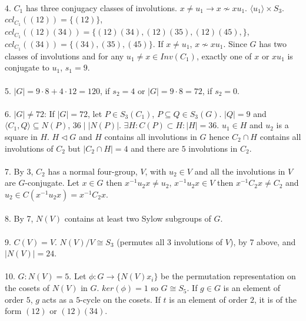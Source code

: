 \\
4.
$C_1$ has three conjugacy classes of involutions.  $x \ne u_1 \rightarrow x \nsim x u_1$.
$ \langle u_1 \rangle \times S_3$. 
$ccl_{C_1}((12))= \{ (12) \}$,
$ccl_{C_1}((12)(34))= \{ (12)(34), (12)(35), (12)(45), \}$,
$ccl_{C_1}((34))= \{ (34) , (35), (45) \}$.  If $x \ne u_1$, $ x \nsim x u_1$.
Since $G$ has two classes of involutions and for any $u_1 \ne x \in Inv(C_1 )$,
exactly one of $x$  or $xu_1$ is conjugate to $u_1$, $s_1 = 9$.
\\
\\
5.
$|G|= 9 \cdot 8 + 4 \cdot 12 = 120$, if $s_2=4$ or $|G|= 9 \cdot 8 = 72$, if $s_2 = 0$.
\\
\\
6. $|G| \ne 72$: If $|G|=72$, let
$P \in S_3(C_1)$, $P \subseteq Q \in S_3(G)$.  
$|Q|=9$ and $ \langle C_1 , Q \rangle \subseteq N(P)$,
$36 \mid |N(P)|$.
$\exists H: C(P) \subset H: |H|=36$.  $u_1 \in H$ and $u_2$ is a square in $H$.
$H \lhd G$ and $H$ contains all involutions in $G$ hence $C_2 \cap H$ contains all involutions of
$C_2$ but $|C_2 \cap H|=4$ and there are $5$ involutions in $C_2$.
\\
\\
7. By 3, $C_2$ has a normal four-group, $V$, with $u_2 \in V$ and all the involutions
in $V$ are $G$-conjugate.
Let $x \in G$ then $x^{-1} u_2 x \ne u_2$, $x^{-1} u_2 x \in V$ then
$x^{-1} C_2 x \ne C_2$ and
$u_2 \in C(x^{-1} u_2 x) = x^{-1} C_2 x$.
\\
\\
8. By 7, $N(V)$ contains at least two Sylow subgroups of $G$.
\\
\\
9.  $C(V)=V$.
$N(V)/V \cong S_3$ (permutes all $3$ involutions of $V$), by 7 above, and $|N(V)|= 24$.
\\
\\
10. $G:N(V)= 5$. Let $\phi: G \rightarrow \{N(V)x_i\}$ be the permutation representation
on the cosets of $N(V)$ in $G$.  $ker(\phi) = 1$ so $G \cong S_5$.
If $g \in G$ is an element
of order $5$, $g$ acts as a $5$-cycle on the cosets.  If $t$ is an element of order $2$,
it is of the form $(12)$ or $(12)(34)$.
